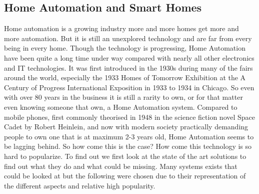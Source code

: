 \subsection{Home Automation and Smart Homes}
Home automation is a growing industry more and more homes get more and more automation. But it is still an unexplored technology and are far from every being in every home. Though the technology is progressing, Home Automation have been quite a long time under way compared with nearly all other electronics and IT technologies. It was first introduced in the 1930s during many of the fairs around the world, especially the 1933 Homes of Tomorrow Exhibition at the A Century of Progress International Exposition in 1933 to 1934 in Chicago. So even with over 80 years in the business it is still a rarity to own, or for that matter even knowing someone that own, a Home Automation system. Compared to mobile phones, first commonly theorised in 1948 in the science fiction novel Space Cadet by Robert Heinlein, and now with modern society practically demanding people to own one that is at maximum 2-3 years old, Home Automation seems to be lagging behind. So how come this is the case? How come this technology is so hard to popularize. To find out we first look at the state of the art solutions to find out what they do and what could be missing. Many systems exists that could be looked at but the following were chosen due to their representation of the different aspects and relative high popularity.

